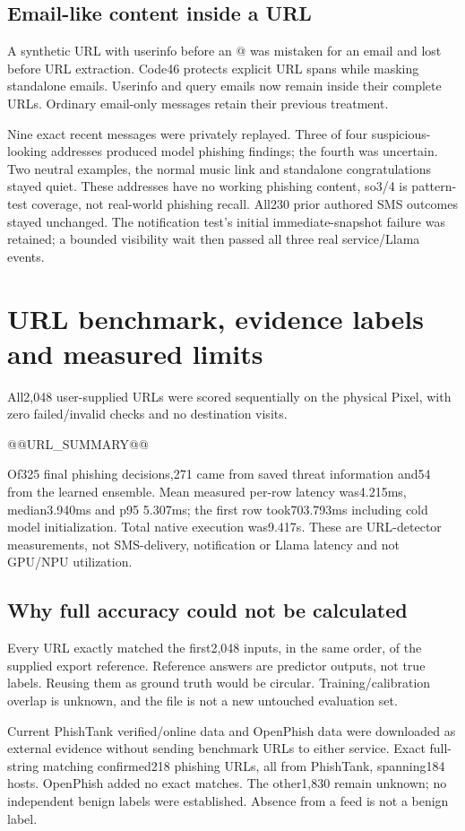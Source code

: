 \section{Email-like content inside a URL}
A synthetic URL with userinfo before an @ was mistaken for an email and lost before URL extraction. Code46 protects explicit URL spans while masking standalone emails. Userinfo and query emails now remain inside their complete URLs. Ordinary email-only messages retain their previous treatment.

Nine exact recent messages were privately replayed. Three of four suspicious-looking  addresses produced model phishing findings; the fourth was uncertain. Two neutral examples, the normal music link and standalone congratulations stayed quiet. These addresses have no working phishing content, so3/4 is pattern-test coverage, not real-world phishing recall. All230 prior authored SMS outcomes stayed unchanged. The notification test's initial immediate-snapshot failure was retained; a bounded visibility wait then passed all three real service/Llama events.

\chapter{URL benchmark, evidence labels and measured limits}
All2,048 user-supplied URLs were scored sequentially on the physical Pixel, with zero failed/invalid checks and no destination visits.

@@URL_SUMMARY@@

Of325 final phishing decisions,271 came from saved threat information and54 from the learned ensemble. Mean measured per-row latency was4.215ms, median3.940ms and p95 5.307ms; the first row took703.793ms including cold model initialization. Total native execution was9.417s. These are URL-detector measurements, not SMS-delivery, notification or Llama latency and not GPU/NPU utilization.

\section{Why full accuracy could not be calculated}
Every URL exactly matched the first2,048 inputs, in the same order, of the supplied export reference. Reference answers are predictor outputs, not true labels. Reusing them as ground truth would be circular. Training/calibration overlap is unknown, and the file is not a new untouched evaluation set.

Current PhishTank verified/online data and OpenPhish data were downloaded as external evidence without sending benchmark URLs to either service. Exact full-string matching confirmed218 phishing URLs, all from PhishTank, spanning184 hosts. OpenPhish added no exact matches. The other1,830 remain unknown; no independent benign labels were established. Absence from a feed is not a benign label.

